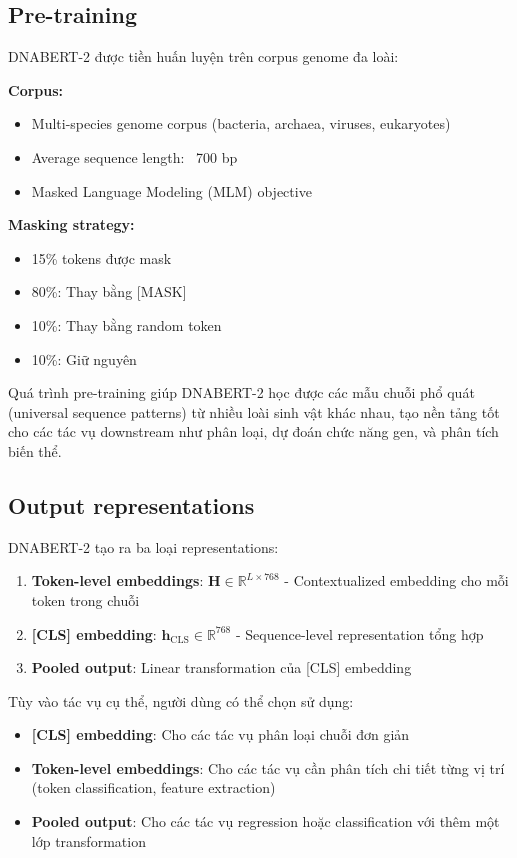 \subsection{Pre-training}

DNABERT-2 được tiền huấn luyện trên corpus genome đa loài:

\textbf{Corpus:}
\begin{itemize}
    \item Multi-species genome corpus (bacteria, archaea, viruses, eukaryotes)
    \item Average sequence length: ~700 bp
    \item Masked Language Modeling (MLM) objective
\end{itemize}

\textbf{Masking strategy:}
\begin{itemize}
    \item 15\% tokens được mask
    \item 80\%: Thay bằng [MASK]
    \item 10\%: Thay bằng random token
    \item 10\%: Giữ nguyên
\end{itemize}

Quá trình pre-training giúp DNABERT-2 học được các mẫu chuỗi phổ quát (universal sequence patterns) từ nhiều loài sinh vật khác nhau, tạo nền tảng tốt cho các tác vụ downstream như phân loại, dự đoán chức năng gen, và phân tích biến thể.

\subsection{Output representations}

DNABERT-2 tạo ra ba loại representations:

\begin{enumerate}
    \item \textbf{Token-level embeddings}: $\mathbf{H} \in \mathbb{R}^{L \times 768}$ - Contextualized embedding cho mỗi token trong chuỗi
    \item \textbf{[CLS] embedding}: $\mathbf{h}_{\text{CLS}} \in \mathbb{R}^{768}$ - Sequence-level representation tổng hợp
    \item \textbf{Pooled output}: Linear transformation của [CLS] embedding
\end{enumerate}

Tùy vào tác vụ cụ thể, người dùng có thể chọn sử dụng:
\begin{itemize}
    \item \textbf{[CLS] embedding}: Cho các tác vụ phân loại chuỗi đơn giản
    \item \textbf{Token-level embeddings}: Cho các tác vụ cần phân tích chi tiết từng vị trí (token classification, feature extraction)
    \item \textbf{Pooled output}: Cho các tác vụ regression hoặc classification với thêm một lớp transformation
\end{itemize}

